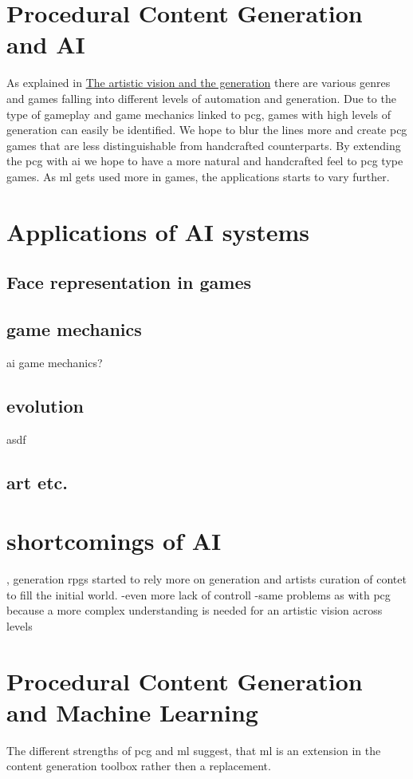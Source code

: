 \documentclass[10pt,a4paper]{article}
\begin{document}
\section{Procedural Content Generation and AI}
As explained in \hyperref[sec:visionVSgeneration]{The artistic vision and the generation} there are various genres and games falling into different levels of automation and generation. Due to the type of gameplay and game mechanics linked to \gls{pcg}, games with high levels of generation can easily be identified. We hope to blur the lines more and create \gls{pcg} games that are less distinguishable from handcrafted counterparts. By extending the \gls{pcg} with \gls{ai} we hope to have a more natural and handcrafted feel to \gls{pcg} type games. As \gls{ml} gets used more in games, the applications starts to vary further.

\section{Applications of AI systems}
\subsection{Face representation in games}
\cite{Feng2018}
\subsection{game mechanics}
ai game mechanics?
\subsection{evolution}
asdf
\subsection{art etc.}

\section{shortcomings of AI}
, generation \gls{rpg}s started to rely more on generation and artists curation of contet to fill the initial world.
-even more lack of controll
-same problems as with \gls{pcg} because a more complex understanding is needed for an artistic vision across levels

\section{Procedural Content Generation and Machine Learning}
The different strengths of \gls{pcg} and \gls{ml} suggest, that \gls{ml} is an extension in the content generation toolbox rather then a replacement.
\end{document}
